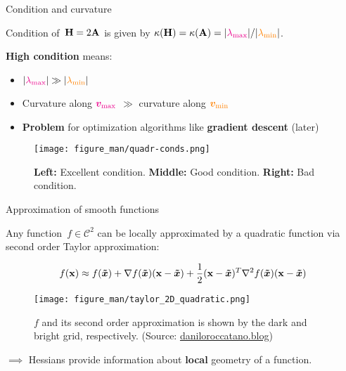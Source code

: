 \documentclass[11pt,compress,t,notes=noshow, xcolor=table]{beamer}
\begin{document}
\begin{vbframe}{Condition and curvature}

Condition of~$\mathbf{H} = 2\mathbf{A}$ is given by $\kappa(\mathbf{H}) = \kappa(\mathbf{A}) = |\textcolor{magenta}{\lambda_\text{max}}| / |\textcolor{orange}{\lambda_\text{min}}|$.

\vspace{\baselineskip}

\textbf{High condition} means: 

\begin{itemize}
    \item $|\textcolor{magenta}{\lambda_\text{max}}| \gg |\textcolor{orange}{\lambda_\text{min}}|$
    \item Curvature along $\textcolor{magenta}{\bm{v}_\text{max}}$ $\gg$ curvature along $\textcolor{orange}{\bm{v}_\text{min}}$
    \item \textbf{Problem} for optimization algorithms like \textbf{gradient descent} (later)
\end{itemize}

\begin{figure}
    \centering
    \texttt{[image: figure\_man/quadr-conds.png]}
    \caption*{\footnotesize \textbf{Left:} Excellent condition. \textbf{Middle:} Good condition. \textbf{Right:} Bad condition.}
\end{figure}

\end{vbframe}

\begin{vbframe}{Approximation of smooth functions}

Any function~$f \in \mathcal{C}^2$ can be locally approximated by a quadratic function via second order Taylor approximation: 

\vspace*{-0.5\baselineskip}

\begin{equation*}
    f(\mathbf{x}) \approx f(\bm{\tilde{x}}) + \nabla f(\bm{\tilde{x}})(\mathbf{x}-\bm{\tilde{x}}) + \frac 12(\mathbf{x}-\bm{\tilde{x}})^T\nabla^2 f(\bm{\tilde{x}})(\mathbf{x}-\bm{\tilde{x}})    
\end{equation*}

\vspace{-0.5\baselineskip}

\begin{figure}
    \texttt{[image: figure\_man/taylor\_2D\_quadratic.png]}
    \caption*{\footnotesize $f$ and its second order approximation is shown by the dark and bright grid, respectively.
        (Source: \url{daniloroccatano.blog})}
\end{figure}

$\implies$ Hessians provide information about \textbf{local} geometry of a function.

\end{vbframe}
  
\endlecture
\end{document}
